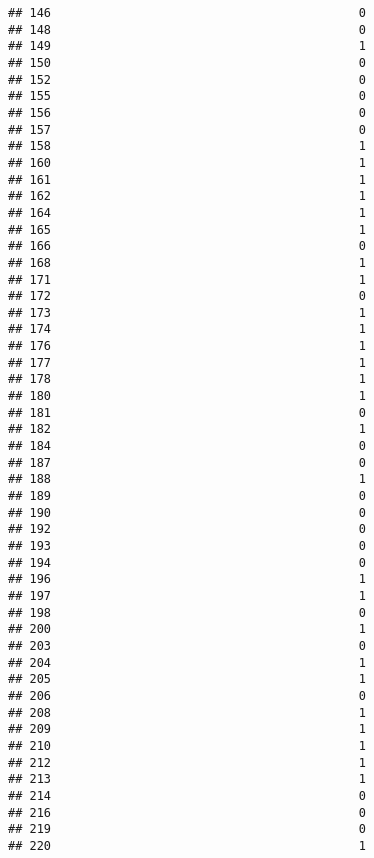 \documentclass[
]{article}
\begin{document}
\begin{verbatim}
## 146                                           0
## 148                                           0
## 149                                           1
## 150                                           0
## 152                                           0
## 155                                           0
## 156                                           0
## 157                                           0
## 158                                           1
## 160                                           1
## 161                                           1
## 162                                           1
## 164                                           1
## 165                                           1
## 166                                           0
## 168                                           1
## 171                                           1
## 172                                           0
## 173                                           1
## 174                                           1
## 176                                           1
## 177                                           1
## 178                                           1
## 180                                           1
## 181                                           0
## 182                                           1
## 184                                           0
## 187                                           0
## 188                                           1
## 189                                           0
## 190                                           0
## 192                                           0
## 193                                           0
## 194                                           0
## 196                                           1
## 197                                           1
## 198                                           0
## 200                                           1
## 203                                           0
## 204                                           1
## 205                                           1
## 206                                           0
## 208                                           1
## 209                                           1
## 210                                           1
## 212                                           1
## 213                                           1
## 214                                           0
## 216                                           0
## 219                                           0
## 220                                           1

\end{verbatim}
\end{document}
